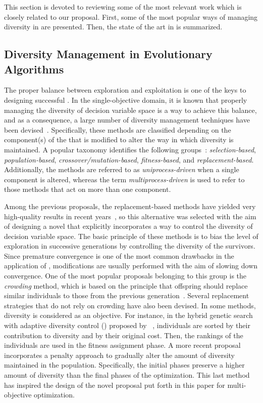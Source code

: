 This section is devoted to reviewing some of the most relevant work which is closely related to our proposal.
%
First, some of the most popular ways of managing diversity in \EAS{} are presented.
%
Then, the state of the art in \MOEAS{} is summarized.

\subsection{Diversity Management in Evolutionary Algorithms}

The proper balance between exploration and exploitation is one of the keys to designing successful \EAS{}.
%
In the single-objective domain, it is known that properly managing the diversity of decision 
variable space is a way to achieve this balance,
and as a consequence, a large number of diversity management techniques have been devised~\citep{Mohan:14}.
%
Specifically, these methods are classified depending on the component(s) of the \EA{} that is modified to alter the way in which 
diversity is maintained.
%
A popular taxonomy identifies the following groups~\citep{Joel:Crepinsek}: \textit{selection-based}, \textit{population-based}, 
\textit{crossover/mutation-based}, \textit{fitness-based}, and \textit{replacement-based}.
%
Additionally, the methods are referred to as \textit{uniprocess-driven} when a single component is altered, whereas the term
\textit{multiprocess-driven} is used to refer to those methods that act on more than one component.

Among the previous proposals, the replacement-based methods have yielded very high-quality results in recent years~\citep{Segura:17}, so
this alternative was selected with the aim of designing a novel \MOEA{} that explicitly incorporates a way to control the diversity 
of decision variable space.
%
The basic principle of these methods is to bias the level of exploration in successive generations by 
controlling the diversity of the survivors.
%
Since premature convergence is one of the most common drawbacks in the application of \EAS{}, 
modifications are usually performed with the aim of slowing down convergence.
%
One of the most popular proposals belonging to this group is the \textit{crowding} method, which
is based on the principle that offspring should replace similar individuals to those from the previous generation~\citep{Mengshoel:14}.
%
Several replacement strategies that do not rely on crowding have also been devised.
%
In some methods, diversity is considered as an objective.
%
For instance, in the hybrid genetic search with adaptive diversity control (\HGSADC{}) proposed by ~\cite{Vidal:13}, individuals are sorted 
by their contribution to diversity and by their original cost.
%
Then, the rankings of the individuals are used in the fitness assignment phase.
%
A more recent proposal~\citep{Segura:17} incorporates a penalty approach to gradually alter the amount of diversity 
maintained in the population.
%
Specifically, the initial phases preserve a higher amount of diversity than the final phases of the optimization.
%
This last method has inspired the design of the novel proposal put forth in this paper for multi-objective optimization.
%


